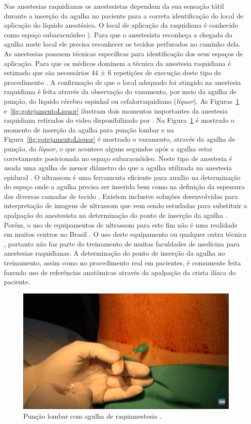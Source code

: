 Nas anestesias raquidianas os anestesistas dependem da sua sensação tátil durante a inserção da agulha no paciente para a correta identificação do local de aplicação do líquido anestésico. O local de aplicação da raquidiana é conhecido como espaço subaracnóideo \cite{Miller2009}). Para que o anestesista reconheça a chegada da agulha neste local ele precisa reconhecer os tecidos perfurados no caminho dela. As anestesias possuem técnicas específicas para identificação dos seus espaços de aplicação. Para que os médicos dominem a técnica da anestesia raquidiana é estimado que são necessários 44 ± 6 repetições de execução deste tipo de procedimento \cite{Kopacz1996}. A confirmação de que o local adequado foi atingido na anestesia raquidiana é feita através da observação do vazamento, por meio da agulha de punção, do liquido cérebro espinhal ou cefalorraquidiano (\textit{líquor}). As Figuras~\ref{fig:puncaoLombar} e~\ref{fig:gotejamentoLiquor} ilustram dois momentos importantes da anestesia raquidiana retirados do video disponibilizado por \textcite{Londero2018}. Na Figura~\ref{fig:puncaoLombar} é mostrado o momento de inserção da agulha para punção lombar e na Figura~\ref{fig:gotejamentoLiquor} é mostrado o vazamento, através da agulha de punção, do \textit{líquor}, o que acontece alguns segundos após a agulha estar corretamente posicionada no espaço subaracnóideo. Neste tipo de anestesia é usada uma agulha de menor diâmetro do que a agulha utilizada na anestesia epidural \cite{Miller2009}. O ultrassom é uma ferramenta eficiente para auxílio na determinação do espaço onde a agulha precisa ser inserida \cite{Helayel2010, Soni2019} bem como na definição da espessura das diversas camadas de tecido \cite{Klingensmith2022}. Existem inclusive soluções desenvolvidas para interpretação de imagens de ultrassom que vem sendo estudadas para substituir a apalpação do anestesista na determinação do ponto de inserção da agulha \cite{Ni2021}. Porém, o uso de equipamentos de ultrassom para este fim não é uma realidade em muitos centros no Brasil \cite{Hamaji2016}. O uso deste equipamento ou qualquer outra técnica \cite{Berde2022}, portanto não faz parte do treinamento de muitas faculdades de medicina para anestesias raquidianas. A determinação do ponto de inserção da agulha no treinamento, assim como no procedimento real em pacientes, é comumente feita fazendo uso de referências anatômicas através da apalpação da crista ilíaca do paciente.

\begin{figure}[!ht]
   \centering
   \includegraphics[width=0.6\linewidth]{capitulos/figuras/2.PuncaoLombar.png}
   \caption{Punção lombar com agulha de raquianestesia  \cite{Londero2018}.}
   \label{fig:puncaoLombar}
\end{figure}

